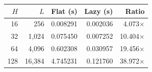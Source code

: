 \begin{tabular}{rrrrr}
\toprule
$H$ & $L$ & Flat (s) & Lazy (s) & Ratio \\
\midrule
16 & 256 & 0.008291 & 0.002036 & 4.073$\times$ \\
32 & 1,024 & 0.075450 & 0.007252 & 10.404$\times$ \\
64 & 4,096 & 0.602308 & 0.030957 & 19.456$\times$ \\
128 & 16,384 & 4.745231 & 0.121760 & 38.972$\times$ \\
\bottomrule
\end{tabular}
